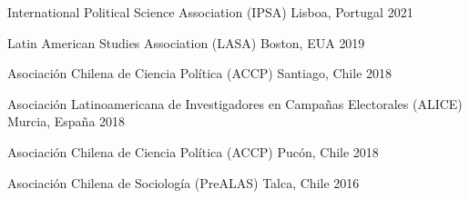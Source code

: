





\vspace{1mm}

\begin{cvhonors}
\cvconf
{International Political Science Association (IPSA)} 
{Lisboa, Portugal}
{2021}
\end{cvhonors}

\begin{cvhonors}
\cvconf
{Latin American Studies Association (LASA)} 
{Boston, EUA}
{2019}
\end{cvhonors}

\begin{cvhonors}
\cvconf
{Asociación Chilena de Ciencia Política (ACCP)} 
{Santiago, Chile}
{2018}
\end{cvhonors}

\begin{cvhonors}
\cvconf
{Asociación Latinoamericana de Investigadores en Campañas Electorales (ALICE)} 
{Murcia, España}
{2018}
\end{cvhonors}

\begin{cvhonors}
\cvconf
{Asociación Chilena de Ciencia Política (ACCP)} 
{Pucón, Chile}
{2018}
\end{cvhonors}


\begin{cvhonors}
\cvconf
{Asociación Chilena de Sociología (PreALAS)} 
{Talca, Chile}
{2016}
\end{cvhonors}

